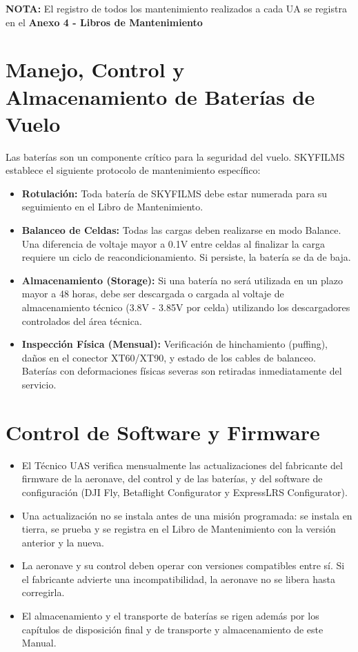 \textbf{NOTA:} El registro de todos los mantenimiento realizados a cada UA se registra en el \textbf{Anexo 4 - Libros de Mantenimiento}

\section{Manejo, Control y Almacenamiento de Baterías de Vuelo}
Las baterías son un componente crítico para la seguridad del vuelo. SKYFILMS establece el siguiente protocolo de mantenimiento específico:


\begin{itemize}
    \item \textbf{Rotulación:} Toda batería de SKYFILMS debe estar numerada para su seguimiento en el Libro de Mantenimiento.

    \item \textbf{Balanceo de Celdas:} Todas las cargas deben realizarse en modo Balance. Una diferencia de voltaje mayor a 0.1V entre celdas al finalizar la carga requiere un ciclo de reacondicionamiento. Si persiste, la batería se da de baja.

    \item \textbf{Almacenamiento (Storage):} Si una batería no será utilizada en un plazo mayor a 48 horas, debe ser descargada o cargada al voltaje de almacenamiento técnico (3.8V - 3.85V por celda) utilizando los descargadores controlados del área técnica.

    \item \textbf{Inspección Física (Mensual):} Verificación de hinchamiento (puffing), daños en el conector XT60/XT90, y estado de los cables de balanceo. Baterías con deformaciones físicas severas son retiradas inmediatamente del servicio.
\end{itemize}

\section{Control de Software y Firmware}
\begin{itemize}
    \item El Técnico UAS verifica mensualmente las actualizaciones del fabricante del firmware de la aeronave, del control y de las baterías, y del software de configuración (DJI Fly, Betaflight Configurator y ExpressLRS Configurator).
    \item Una actualización no se instala antes de una misión programada: se instala en tierra, se prueba y se registra en el Libro de Mantenimiento con la versión anterior y la nueva.
    \item La aeronave y su control deben operar con versiones compatibles entre sí. Si el fabricante advierte una incompatibilidad, la aeronave no se libera hasta corregirla.
    \item El almacenamiento y el transporte de baterías se rigen además por los capítulos de disposición final y de transporte y almacenamiento de este Manual.
\end{itemize}

